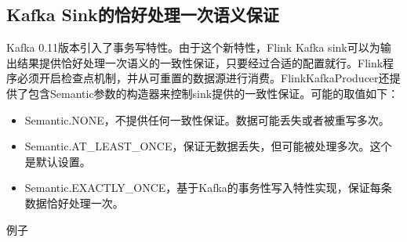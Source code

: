 \documentclass[cn,11pt,chinese]{elegantbook}
\providecommand{\tightlist}{%
  \setlength{\itemsep}{0pt}\setlength{\parskip}{0pt}}
\begin{document}
\hypertarget{kafka-sinkux7684ux6070ux597dux5904ux7406ux4e00ux6b21ux8bedux4e49ux4fddux8bc1}{%
\subsection{Kafka
Sink的恰好处理一次语义保证}\label{kafka-sinkux7684ux6070ux597dux5904ux7406ux4e00ux6b21ux8bedux4e49ux4fddux8bc1}}

Kafka 0.11版本引入了事务写特性。由于这个新特性，Flink Kafka
sink可以为输出结果提供恰好处理一次语义的一致性保证，只要经过合适的配置就行。Flink程序必须开启检查点机制，并从可重置的数据源进行消费。FlinkKafkaProducer还提供了包含Semantic参数的构造器来控制sink提供的一致性保证。可能的取值如下：

\begin{itemize}
\tightlist
\item
  Semantic.NONE，不提供任何一致性保证。数据可能丢失或者被重写多次。
\item
  Semantic.AT\_LEAST\_ONCE，保证无数据丢失，但可能被处理多次。这个是默认设置。
\item
  Semantic.EXACTLY\_ONCE，基于Kafka的事务性写入特性实现，保证每条数据恰好处理一次。
\end{itemize}

例子
\end{document}
